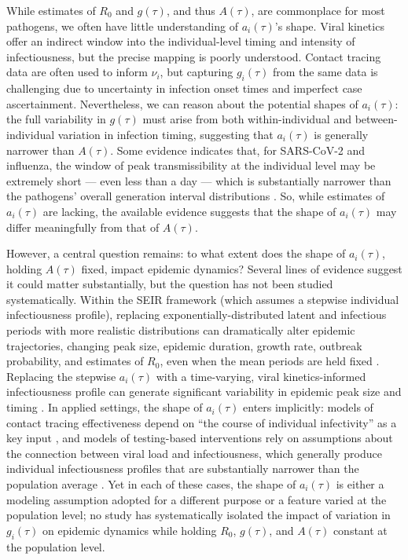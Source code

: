While estimates of $R_0$ and $g(\tau)$, and thus $A(\tau)$, are commonplace for most pathogens, we often have little understanding of $a_i(\tau)$'s shape. Viral kinetics offer an indirect window into the individual-level timing and intensity of infectiousness, but the precise mapping is poorly understood. Contact tracing data are often used to inform $\nu_i$, but capturing $g_i(\tau)$ from the same data is challenging due to uncertainty in infection onset times and imperfect case ascertainment. Nevertheless, we can reason about the potential shapes of $a_i(\tau)$: the full variability in $g(\tau)$ must arise from both within-individual and between-individual variation in infection timing, suggesting that $a_i(\tau)$ is generally narrower than $A(\tau)$. Some evidence indicates that, for SARS-CoV-2 and influenza, the window of peak transmissibility at the individual level may be extremely short --- even less than a day --- which is substantially narrower than the pathogens' overall generation interval distributions \cite{goyal_viral_2021}. So, while estimates of $a_i(\tau)$ are lacking, the available evidence suggests that the shape of $a_i(\tau)$ may differ meaningfully from that of $A(\tau)$. 


However, a central question remains: to what extent does the shape of $a_i(\tau)$, holding $A(\tau)$ fixed, impact epidemic dynamics? Several lines of evidence suggest it could matter substantially, but the question has not been studied systematically. Within the SEIR framework (which assumes a stepwise individual infectiousness profile), replacing exponentially-distributed latent and infectious periods with more realistic distributions can dramatically alter epidemic trajectories, changing peak size, epidemic duration, growth rate, outbreak probability, and estimates of $R_0$, even when the mean periods are held fixed \citep{lloyd_realistic_2001, wearing_appropriate_2005, britton_epidemic_2009}. Replacing the stepwise $a_i(\tau)$ with a time-varying, viral kinetics-informed infectiousness profile can generate significant variability in epidemic peak size and timing \citep{li_epidemic_2023}. In applied settings, the shape of $a_i(\tau)$ enters implicitly: models of contact tracing effectiveness depend on ``the course of individual infectivity'' as a key input \citep{klinkenberg_effectiveness_2006}, and models of testing-based interventions rely on assumptions about the connection between viral load and infectiousness, which generally produce individual infectiousness profiles that are substantially narrower than the population average \citep{larremore_test_2021}. Yet in each of these cases, the shape of $a_i(\tau)$ is either a modeling assumption adopted for a different purpose or a feature varied at the population level; no study has systematically isolated  the impact of variation in $g_i(\tau)$ on epidemic  dynamics while holding $R_0$, $g(\tau)$, and $A(\tau)$ constant at the population level.

